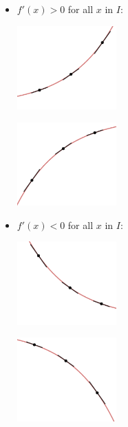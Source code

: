 \begin{itemize}

\item  $f'(x) > 0$  for all $x$ in $I$:

\begin{center}

\begin{multicols}{2}

\includegraphics[width=1.5in]{./AppDerivativesGraphics/IncCU.png} 

\includegraphics[width=1.5in]{./AppDerivativesGraphics/IncCD.png} 

\end{multicols}

\end{center}

\item  $f'(x) < 0$  for all $x$ in $I$:


\begin{center}

\begin{multicols}{2}

\includegraphics[width=1.5in]{./AppDerivativesGraphics/DecCU.png} 

\includegraphics[width=1.5in]{./AppDerivativesGraphics/DecCD.png} 


\end{multicols}
\end{center}
\end{itemize}
